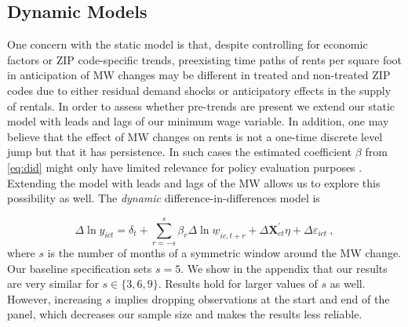 \subsection{Dynamic Models}

One concern with the static model is that, despite controlling for economic factors or ZIP 
code-specific trends, preexisting time paths of rents per square foot in anticipation of MW 
changes may be different in treated and non-treated ZIP codes due to either residual demand 
shocks or anticipatory effects in the supply of rentals. In order to assess whether pre-trends 
are present we extend our static model with leads and lags of our minimum wage variable. 
In addition, one may believe that the effect of MW changes on rents is not a one-time discrete 
level jump but that it has persistence. In such cases the estimated coefficient $\beta$ from 
\autoref{eq:did} might only have limited relevance for policy evaluation purposes 
\parencite{callaway2019}. Extending the model with leads and lags of the MW allows us to 
explore this possibility as well. The \textit{dynamic} difference-in-differences model is

\begin{equation} \label{eq:leads_lags}
	\Delta \ln y_{ict} = \delta_t
						+ \sum_{r=-s}^{s} \beta_r \Delta \ln \underline{w}_{ic,t+r}
						+ \Delta \mathbf{X}^{'}_{ct}\eta
						+ \Delta \varepsilon_{ict} \ ,
\end{equation}
where $s$ is the number of months of a symmetric window around the MW change. Our baseline
specification sets $s = 5$. We show in the appendix that our results are very similar for
$s \in \{3, 6, 9\}$. Results hold for larger values of $s$ as well. However, increasing $s$ 
implies dropping observations at the start and end of the panel, which decreases our 
sample size and makes the results less reliable.

